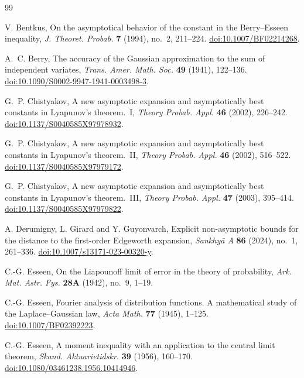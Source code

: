 \documentclass[aop]{imsart}
\theoremstyle{plain}
\theoremstyle{definition}
\theoremstyle{definition}
\begin{document}
\newpage
\begin{thebibliography}{99}

V. Bentkus,
On the asymptotical behavior of the constant in the Berry--Esseen inequality,
\textit{J. Theoret. Probab.} \textbf{7} (1994), no.~2, 211--224.
\href{https://doi.org/10.1007/BF02214268}{doi:10.1007/BF02214268}.

A.~C. Berry,
The accuracy of the Gaussian approximation to the sum of independent variates,
\textit{Trans. Amer. Math. Soc.} \textbf{49} (1941), 122--136.
\href{https://doi.org/10.1090/S0002-9947-1941-0003498-3}{doi:10.1090/S0002-9947-1941-0003498-3}.

G.~P. Chistyakov,
A new asymptotic expansion and asymptotically best constants in Lyapunov's theorem.~I,
\textit{Theory Probab. Appl.} \textbf{46} (2002), 226--242.
\href{https://doi.org/10.1137/S0040585X97978932}{doi:10.1137/S0040585X97978932}.

G.~P. Chistyakov,
A new asymptotic expansion and asymptotically best constants in Lyapunov's theorem.~II,
\textit{Theory Probab. Appl.} \textbf{46} (2002), 516--522.
\href{https://doi.org/10.1137/S0040585X97979172}{doi:10.1137/S0040585X97979172}.

G.~P. Chistyakov,
A new asymptotic expansion and asymptotically best constants in Lyapunov's theorem.~III,
\textit{Theory Probab. Appl.} \textbf{47} (2003), 395--414.
\href{https://doi.org/10.1137/S0040585X97979822}{doi:10.1137/S0040585X97979822}.

A. Derumigny, L. Girard and Y. Guyonvarch,
Explicit non-asymptotic bounds for the distance to the first-order Edgeworth expansion,
\textit{Sankhy\=a A} \textbf{86} (2024), no.~1, 261--336.
\href{https://doi.org/10.1007/s13171-023-00320-y}{doi:10.1007/s13171-023-00320-y}.

C.-G. Esseen,
On the Liapounoff limit of error in the theory of probability,
\textit{Ark. Mat. Astr. Fys.} \textbf{28A} (1942), no.~9, 1--19.

C.-G. Esseen,
Fourier analysis of distribution functions. A mathematical study of the Laplace--Gaussian law,
\textit{Acta Math.} \textbf{77} (1945), 1--125.
\href{https://doi.org/10.1007/BF02392223}{doi:10.1007/BF02392223}.

C.-G. Esseen,
A moment inequality with an application to the central limit theorem,
\textit{Skand. Aktuarietidskr.} \textbf{39} (1956), 160--170.
\href{https://doi.org/10.1080/03461238.1956.10414946}{doi:10.1080/03461238.1956.10414946}.


\end{thebibliography}
\end{document}
